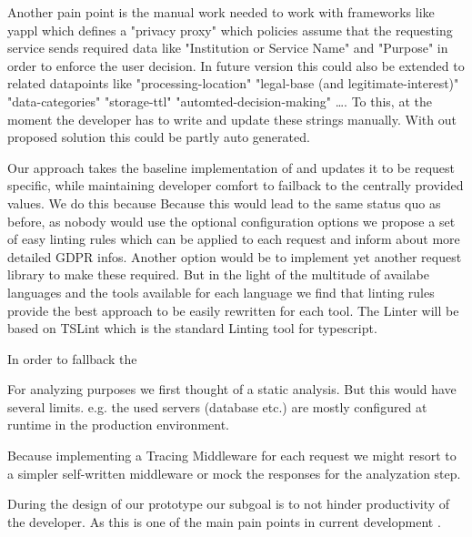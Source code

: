 Another pain point is the manual work needed to work with frameworks like yappl which defines a "privacy proxy" which policies assume that the requesting service sends required data like "Institution or Service Name" and "Purpose" in order to enforce the user decision. In future version this could also be extended to related datapoints like "processing-location" "legal-base (and legitimate-interest)" "data-categories" "storage-ttl" "automted-decision-making" \dots .
To this, at the moment the developer has to write and update these strings manually. With out proposed solution this could be partly auto generated.
 
 
 Our approach takes the baseline implementation of \cite{ErnstTransparencyComputing} and updates it to be request specific, while maintaining developer comfort to failback to the centrally provided values. We do this because 
 Because this would lead to the same status quo as before, as nobody would use the optional configuration options we propose a set of easy linting rules which can be applied to each request and inform about more detailed GDPR infos. Another option would be to implement yet another request library to make these required. But in the light of the multitude of availabe languages and the tools available for each language we find that linting rules provide the best approach to be easily rewritten for each tool. 
 The Linter will be based on TSLint which is the standard Linting tool for typescript. 
 
 
 In order to fallback the 
 
 For analyzing purposes we first thought of a static analysis. But this would have several limits. e.g. the used servers (database etc.) are mostly configured at runtime in the production environment. 


Because implementing a Tracing Middleware for each request we might resort to a simpler self-written middleware or mock the responses for the analyzation step. 

During the design of our prototype our subgoal is to not hinder productivity of the developer. 
As this is one of the main pain points in current development \cite{StateDevOps}. 
